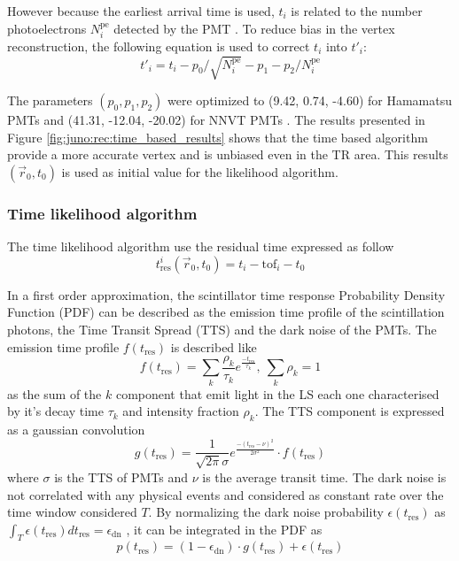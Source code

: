 \documentclass[../main.tex]{subfiles}
\begin{document}
However because the earliest arrival time is used, $t_i$ is related to the number photoelectrons $N_i^{\mathrm{pe}}$ detected by the PMT \cite{ranucci_analytical_1995, galbiati_time_2006, moszynski_status_1979}. To reduce bias in the vertex reconstruction, the following equation is used to correct $t_i$ into $t'_i$:
\begin{equation}
  t'_{i} = t_i - p_0 / \sqrt{N_i^{\mathrm{pe}}} - p_1 - p_2 / N_i^{\mathrm{pe}}
\end{equation}

The parameters $(p_0, p_1, p_2)$ were optimized to (9.42, 0.74, -4.60) for Hamamatsu PMTs and (41.31, -12.04, -20.02) for NNVT PMTs \cite{li_event_2021}. The results presented in Figure \ref{fig:juno:rec:time_based_results} shows that the time based algorithm provide a more accurate vertex and is unbiased even in the TR area. This results $(\vec{r}_0, t_0)$ is used as initial value for the likelihood algorithm.

\subsubsection{Time likelihood algorithm}

The time likelihood algorithm use the residual time expressed as follow
\begin{equation}
  \label{eq:juno:rec:t_res}
  t_{\mathrm{res}}^i(\vec{r}_0, t_0) = t_i - \mathrm{tof}_i - t_0
\end{equation}

In a first order approximation, the scintillator time response Probability Density Function (PDF) can be described as the emission time profile of the scintillation photons, the Time Transit Spread (TTS) and the dark noise of the PMTs. The emission time profile $f(t_{\mathrm{res}})$ is described like
\begin{equation}
  f(t_{\mathrm{res}}) = \sum_k \frac{\rho_k}{\tau_k} e^{\frac{-t_{\mathrm{res}}}{\tau_k}}, ~ \sum_k \rho_k = 1
\end{equation}
as the sum of the $k$ component that emit light in the LS each one characterised by it's decay time $\tau_k$ and intensity fraction $\rho_k$. The TTS component is expressed as a gaussian convolution
\begin{equation}
  g(t_{\mathrm{res}}) = \frac{1}{\sqrt{2\pi}\sigma}e^{\frac{-(t_{\mathrm{res}} - \nu)^2}{2\sigma^2}} \cdot f(t_{\mathrm{res}})
\end{equation}
where $\sigma$ is the TTS of PMTs and $\nu$ is the average transit time. The dark noise is not correlated with any physical events and considered as constant rate over the time window considered $T$. By normalizing the dark noise probability $\epsilon(t_{\mathrm{res}})$ as $\int_T \epsilon(t_{\mathrm{res}}) dt_{\mathrm{res}} = \epsilon_{\mathrm{dn}}$ , it can be integrated in the PDF as
\begin{equation}
  \label{eq:juno:juno:tim_like:dn}
  p(t_{\mathrm{res}}) = (1-\epsilon_{\mathrm{dn}}) \cdot g(t_{\mathrm{res}}) + \epsilon(t_{\mathrm{res}})
\end{equation}
\end{document}
